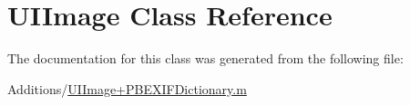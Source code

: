 \hypertarget{class_u_i_image}{
\section{UIImage Class Reference}
\label{class_u_i_image}
}


The documentation for this class was generated from the following file:\begin{DoxyCompactItemize}
\item 
Additions/\hyperlink{_u_i_image_09_p_b_e_x_i_f_dictionary_8m}{UIImage+PBEXIFDictionary.m}\end{DoxyCompactItemize}
